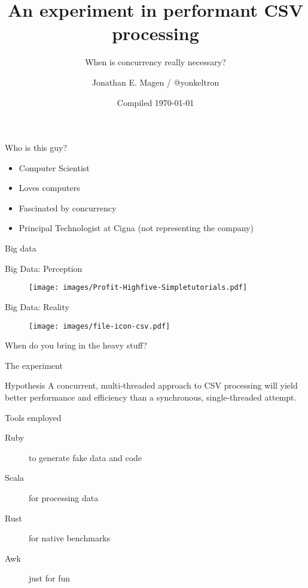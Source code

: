 \documentclass[aspectratio=169,14pt]{beamer}
\title{An experiment in performant CSV processing}
\subtitle{When is concurrency really necessary?}
\author{Jonathan E. Magen / \faicon{twitter} @yonkeltron}
\date{Compiled \today}
\newcommand{\megatext}[1]{
  \begin{center}
    \Huge
    #1
  \end{center}
}
\begin{document}
\frame{\titlepage}

\begin{frame}{Who is this guy?}
  \begin{itemize}
  \item Computer Scientist
  \item Loves computers
  \item Fascinated by concurrency
  \item Principal Technologist at Cigna (not representing the company)
  \end{itemize}
\end{frame}


\begin{frame}
  \megatext{Big data}
\end{frame}

\begin{frame}{Big Data: Perception}
  \begin{figure}
    \texttt{[image: images/Profit-Highfive-Simpletutorials.pdf]}
  \end{figure}
\end{frame}

\begin{frame}{Big Data: Reality}
  \begin{figure}
    \texttt{[image: images/file-icon-csv.pdf]}
  \end{figure}
\end{frame}

\begin{frame}
  \megatext{When do you bring in the heavy stuff?}
\end{frame}

\begin{frame}{The experiment}
  \begin{block}{Hypothesis}
    A concurrent, multi-threaded approach to CSV processing will yield better performance and efficiency than a synchronous, single-threaded attempt.
  \end{block}

  \begin{block}{Tools employed}
    \begin{description}
    \item[Ruby] to generate fake data and code
    \item[Scala] for processing data
    \item[Rust] for native benchmarks
    \item[Awk] just for fun
    \end{description}
  \end{block}
\end{frame}
\end{document}
